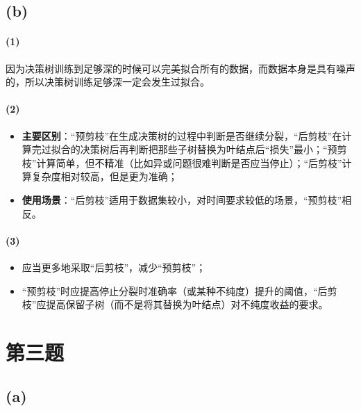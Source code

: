 \documentclass{ctexart}
\begin{document}
\subsection{(b)}\label{b-1}

\paragraph{(1)}\label{section-11}

因为决策树训练到足够深的时候可以完美拟合所有的数据，而数据本身是具有噪声的，所以决策树训练足够深一定会发生过拟合。

\paragraph{(2)}\label{section-12}

\begin{itemize}

\item
  \textbf{主要区别}：``预剪枝''在生成决策树的过程中判断是否继续分裂，``后剪枝''在计算完过拟合的决策树后再判断把那些子树替换为叶结点后``损失''最小；``预剪枝''计算简单，但不精准（比如异或问题很难判断是否应当停止）；``后剪枝''计算复杂度相对较高，但是更为准确；
\item
  \textbf{使用场景}：``后剪枝''适用于数据集较小，对时间要求较低的场景，``预剪枝''相反。
\end{itemize}

\paragraph{(3)}\label{section-13}

\begin{itemize}

\item
  应当更多地采取``后剪枝''，减少``预剪枝''；
\item
  ``预剪枝''时应提高停止分裂时准确率（或某种不纯度）提升的阈值，``后剪枝''应提高保留子树（而不是将其替换为叶结点）对不纯度收益的要求。
\end{itemize}

\section{第三题}\label{ux7b2cux4e09ux9898}

\subsection{(a)}\label{a-2}
\end{document}
